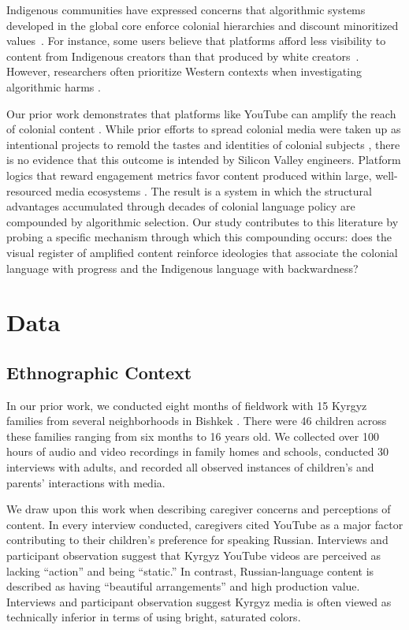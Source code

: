 \documentclass[12pt, letterpaper]{article}
\begin{document}
Indigenous communities have expressed concerns that algorithmic systems developed in the global core enforce colonial hierarchies and discount minoritized values~\citep{Nigatu_2024}. For instance, some users believe that platforms afford less visibility to content from Indigenous creators than that produced by white creators~\citep{mayworm2024}. However, researchers often prioritize Western contexts when investigating algorithmic harms \citep{urman}. 

Our prior work demonstrates that platforms like YouTube can amplify the reach of colonial content \citep{escher2026empire}. While prior efforts to spread colonial media were taken up as intentional projects to remold the tastes and identities of colonial subjects \citep{fanon2007}, there is no evidence that this outcome is intended by Silicon Valley engineers. 
Platform logics that reward engagement metrics favor content produced within large, well-resourced media ecosystems \citep{couldry2019}.
The result is a system in which the structural advantages accumulated through decades of colonial language policy are compounded by algorithmic selection. 
Our study contributes to this literature by probing a specific mechanism through which this compounding occurs: does the visual register of amplified content reinforce ideologies that associate the colonial language with progress and the Indigenous language with backwardness?

\section{Data}

\subsection{Ethnographic Context}

In our prior work, we conducted eight months of fieldwork with 15 Kyrgyz families from several neighborhoods in Bishkek \citep{mcdermott2026}. There were 46 children across these families ranging from six months to 16 years old. We collected over 100 hours of audio and video recordings in family homes and schools, conducted 30 interviews with adults, and recorded all observed instances of children's and parents' interactions with media.

We draw upon this work when describing caregiver concerns and perceptions of content. In every interview conducted, caregivers cited YouTube as a major factor contributing to their children's preference for speaking Russian. Interviews and participant observation suggest that Kyrgyz YouTube videos are perceived as lacking ``action'' and being ``static.'' In contrast, Russian-language content is described as having ``beautiful arrangements'' and high production value. Interviews and participant observation suggest Kyrgyz media is often viewed as technically inferior in terms of using bright, saturated colors.
\end{document}
